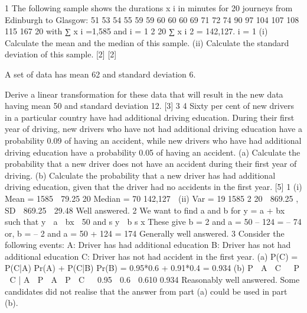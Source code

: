 1
The following sample shows the durations x i in minutes for 20 journeys from
Edinburgh to Glasgow:
51 53 54 55 59 59 60 60 60 69 71 72 74 90 97 104 107 108 115 167
20
with
∑ x i =1,585 and
i = 1
2
20
∑ x i 2 = 142,127.
i = 1
(i) Calculate the mean and the median of this sample.
(ii) Calculate the standard deviation of this sample.
[2]
[2]

A set of data has mean 62 and standard deviation 6.

Derive a linear transformation for these data that will result in the new data having mean 50 and standard deviation 12.
[3]
3
4
Sixty per cent of new drivers in a particular country have had additional driving education. During their first year of driving, new drivers who have not had additional
driving education have a probability 0.09 of having an accident, while new drivers who have had additional driving education have a probability 0.05 of having an
accident.
(a) Calculate the probability that a new driver does not have an accident during
their first year of driving.
(b) Calculate the probability that a new driver has had additional driving
education, given that the driver had no accidents in the first year.
[5]
1
(i)
Mean =
1585
 79.25
20
Median = 70
142,127 
(ii)
Var =
19
1585 2
20  869.25 ,
SD  869.25  29.48
Well answered.
2
We want to find a and b for y = a + bx such that
y  a  bx  50 and s y  b s x
These give b = 2 and a = 50 – 124 = – 74
or, b = – 2 and a = 50 + 124 = 174
Generally well answered.
3
Consider the following events:
A: Driver has had additional education
B: Driver has not had additional education
C: Driver has not had accident in the first year.
(a)
P(C) = P(C|A) Pr(A) + P(C|B) Pr(B) = 0.95*0.6 + 0.91*0.4
= 0.934
(b)
P  A  C  
P  C | A  P  A 
P  C 

0.95  0.6
 0.610
0.934
Reasonably well answered. Some candidates did not realise that the answer from part (a)
could be used in part (b).
